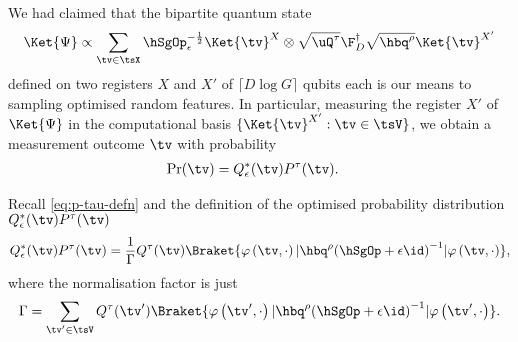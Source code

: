 
  We had claimed that the bipartite quantum state 
  \begin{equation}
    \label{eq:state}
    \Ket{\Psi}\propto\sum_{\tv\in\tsX}\hSgOp_{\epsilon}^{-\frac{1}{2}}\Ket{\tv}^X\otimes \sqrt{\uQ^{\tau}}\F_D^\dag\sqrt{\hbq^{\rho}}\Ket{\tv}^{X'}
  \end{equation}
  defined on two registers $X$ and $X'$ of $\lceil D\log G\rceil$ qubits each is our means to sampling optimised random features. In particular, 
  measuring the register $X'$ of $\Ket{\Psi}$ in the computational basis $\{\Ket{\tv}^{X'}:\tv\in\tsV\}$, we obtain a measurement outcome $\tv$ with probability 
  \begin{align}
    \label{eq:pr-v-app-state}
    \Pr(\tv) &= Q_{\epsilon}^\ast(\tv)P^{\tau}(\tv).
  \end{align}



  Recall \cref{eq:p-tau-defn} and the definition of the optimised probability distribution $Q_{\epsilon}^\ast(\tv)P^{\tau}(\tv)$
  \begin{equation}
    \label{eq:state_1}
    Q_{\epsilon}^\ast(\tv)P^{\tau}(\tv)=
    \frac{1}{\Gamma}Q^{\tau}(\tv)\Braket{\varphi\left(\tv,\cdot\right) | \hbq^{\rho}{\left({\hSgOp}+\epsilon\id\right)}^{-1} | \varphi\left(\tv,\cdot\right)},
  \end{equation}
  where the normalisation factor is just
  \begin{equation}
    \label{eq:gamma-normalisation}
    \Gamma = \sum_{\tv'\in\tsV }Q^{\tau}(\tv')\Braket{\varphi\left(\tv',\cdot\right) | \hbq^{\rho}{\left({\hSgOp}+\epsilon\id\right)}^{-1} | \varphi\left(\tv',\cdot\right)}.
  \end{equation}

